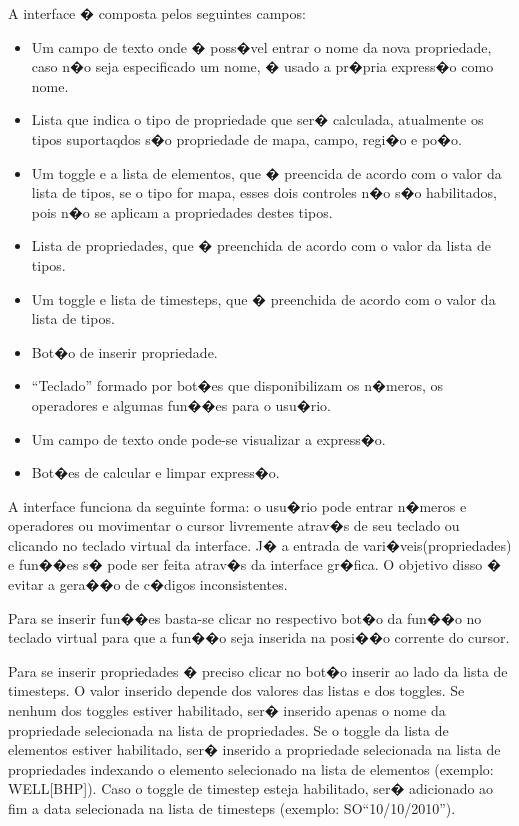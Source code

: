\documentclass[dissertacao,modelo1,brazil]{ThesisPUC}
\begin{document}
A interface � composta pelos seguintes campos: 
\begin{itemize}
  \item Um campo de texto onde � poss�vel entrar o nome da nova propriedade,
  caso n�o seja especificado um nome, � usado a pr�pria express�o como nome.
  \item Lista que indica o tipo de propriedade que ser� calculada, atualmente
  os tipos suportaqdos s�o propriedade de mapa, campo, regi�o e po�o.
  \item Um toggle %
  e a lista de elementos, que � preencida de acordo com o valor da lista de tipos,
  se o tipo for mapa, esses dois controles n�o s�o habilitados, pois n�o se aplicam
  a propriedades destes tipos.
  \item Lista de propriedades, que � preenchida de acordo com o valor da lista de tipos.
  \item Um toggle e lista de timesteps, que � preenchida de acordo com o valor da lista de tipos.
  \item Bot�o de inserir propriedade.
  \item ``Teclado'' formado por bot�es que disponibilizam os n�meros, os operadores e algumas
  fun��es para o usu�rio.
  \item Um campo de texto onde pode-se visualizar a express�o.
  \item Bot�es de calcular e limpar express�o.
\end{itemize}

A interface funciona da seguinte forma: o usu�rio pode entrar n�meros e operadores ou movimentar
o cursor livremente atrav�s de seu teclado ou clicando no teclado virtual da interface.
J� a entrada de vari�veis(propriedades) e fun��es s� pode ser feita atrav�s da interface gr�fica.
O objetivo disso � evitar a gera��o de c�digos inconsistentes.

Para se inserir fun��es basta-se clicar no respectivo bot�o da fun��o no teclado virtual para
que a fun��o seja inserida na posi��o corrente do cursor.

Para se inserir propriedades � preciso clicar no bot�o inserir ao lado da lista de timesteps.
O valor inserido depende dos valores das listas e dos toggles. Se nenhum dos toggles estiver
habilitado, ser� inserido apenas o nome da propriedade selecionada na lista de propriedades.
Se o toggle da lista de elementos estiver habilitado, ser� inserido a propriedade selecionada
na lista de propriedades indexando o elemento selecionado na lista de elementos
(exemplo: WELL[BHP]).
Caso o toggle de timestep esteja habilitado, ser� adicionado ao fim a data selecionada
na lista de timesteps (exemplo: SO``10/10/2010'').
\end{document}
